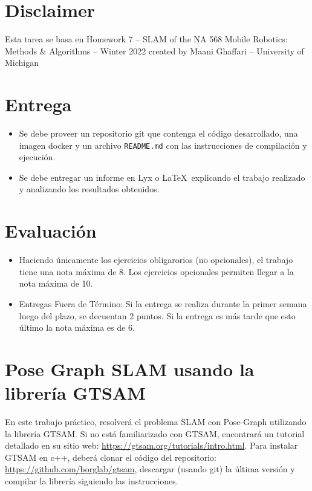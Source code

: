 \documentclass[tp]{lcc}
\begin{document}
\maketitle


\section*{Disclaimer}
Esta tarea se basa en Homework 7 -- SLAM of the NA 568 Mobile Robotics: Methods \& Algorithms -- Winter 2022 created by Maani Ghaffari -- University of Michigan

\section*{Entrega}
	\begin{itemize}
		\item Se debe proveer un repositorio git que contenga el código desarrollado, una imagen docker y un archivo \lstinline{README.md} con las instrucciones de compilación y ejecución.
		
		\item Se debe entregar un informe en Lyx o \LaTeX\  explicando el trabajo realizado y analizando los resultados obtenidos.
	\end{itemize}

\section*{Evaluación}
	\begin{itemize}
		\item Haciendo únicamente los ejercicios obligarorios (no opcionales), el trabajo tiene una nota máxima de 8. Los ejercicios opcionales permiten llegar a la nota máxima de 10.
		
		\item Entregas Fuera de Término: Si la entrega se realiza durante la primer semana luego del plazo, se decuentan 2 puntos. Si la entrega es más tarde que esto último la nota máxima es de 6.
	\end{itemize}

\section*{Pose Graph SLAM usando la librería GTSAM}
%
En este trabajo práctico, resolverá el problema SLAM con Pose-Graph utilizando la librería GTSAM. Si no está familiarizado con GTSAM, encontrará un tutorial detallado en su sitio web: \url{https://gtsam.org/tutorials/intro.html}. Para instalar GTSAM en c++, deberá clonar el código del repositorio: \url{https://github.com/borglab/gtsam}, descargar (usando git) la última versión y compilar la librería siguiendo las instrucciones.
\end{document}
